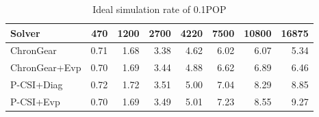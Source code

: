 \begin{table}
\vspace{-10pt}
\centering
\caption {Ideal simulation rate of 0.1\degree POP \label{tab:improve_01}}
\begin{tabular}{|l||r|r|r|r|r|r|r|}
\hline
Solver & 470  & 1200   & 2700 & 4220 & 7500 & 10800 & 16875\\\hline
\hline
ChronGear     &0.71 &1.68&3.38  &4.62 &6.02 &6.07 &5.34\\\hline
ChronGear+Evp &0.70 &1.69&3.44  &4.88 &6.62 &6.89 &6.46\\\hline
P-CSI+Diag    &0.72 &1.72&3.51  &5.00 &7.04 &8.29 &8.85\\\hline
P-CSI+Evp     &0.70 &1.69&3.49  &5.01 &7.23 &8.55 &9.27\\
\hline
\end{tabular}
\end{table}
